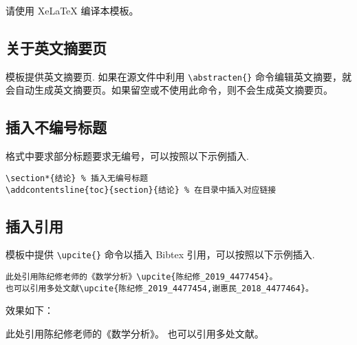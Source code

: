 \documentclass{buaa_fengru}
\begin{document}
请使用 XeLaTeX 编译本模板。

\subsection{关于英文摘要页}

模板提供英文摘要页. 如果在源文件中利用 \verb|\abstracten{}| 命令编辑英文摘要，就会自动生成英文摘要页。如果留空或不使用此命令，则不会生成英文摘要页。

\subsection{插入不编号标题}

格式中要求部分标题要求无编号，可以按照以下示例插入.

\begin{lstlisting}[language=Tex]
\section*{结论} % 插入无编号标题
\addcontentsline{toc}{section}{结论} % 在目录中插入对应链接
\end{lstlisting}

\subsection{插入引用}

模板中提供 \verb|\upcite{}| 命令以插入 Bibtex 引用，可以按照以下示例插入.

\begin{lstlisting}[language=Tex]
此处引用陈纪修老师的《数学分析》\upcite{陈纪修_2019_4477454}。
也可以引用多处文献\upcite{陈纪修_2019_4477454,谢惠民_2018_4477464}。
\end{lstlisting}

效果如下：

此处引用陈纪修老师的《数学分析》。
也可以引用多处文献。

\newpage
\end{document}
